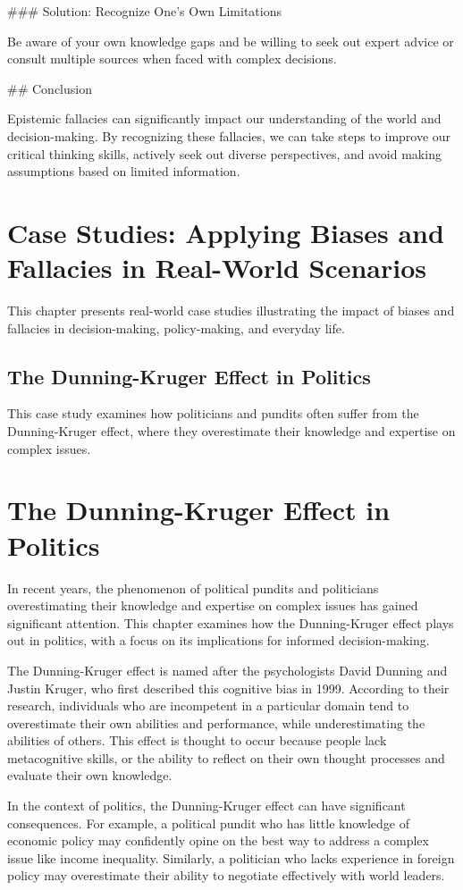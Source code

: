 \documentclass{report}%
\begin{document}
{{{{{{{{{{{{{{### Solution: Recognize One's Own Limitations

Be aware of your own knowledge gaps and be willing to seek out expert advice or consult multiple sources when faced with complex decisions.

## Conclusion

Epistemic fallacies can significantly impact our understanding of the world and decision-making. By recognizing these fallacies, we can take steps to improve our critical thinking skills, actively seek out diverse perspectives, and avoid making assumptions based on limited information.%
\chapter{Case Studies: Applying Biases and Fallacies in Real{-}World Scenarios}%
This chapter presents real-world case studies illustrating the impact of biases and fallacies in decision-making, policy-making, and everyday life.

%
\section{The Dunning{-}Kruger Effect in Politics}%
This case study examines how politicians and pundits often suffer from the Dunning-Kruger effect, where they overestimate their knowledge and expertise on complex issues.

%
\chapter{The Dunning-Kruger Effect in Politics}

In recent years, the phenomenon of political pundits and politicians overestimating their knowledge and expertise on complex issues has gained significant attention. This chapter examines how the Dunning-Kruger effect plays out in politics, with a focus on its implications for informed decision-making.

The Dunning-Kruger effect is named after the psychologists David Dunning and Justin Kruger, who first described this cognitive bias in 1999. According to their research, individuals who are incompetent in a particular domain tend to overestimate their own abilities and performance, while underestimating the abilities of others. This effect is thought to occur because people lack metacognitive skills, or the ability to reflect on their own thought processes and evaluate their own knowledge.

In the context of politics, the Dunning-Kruger effect can have significant consequences. For example, a political pundit who has little knowledge of economic policy may confidently opine on the best way to address a complex issue like income inequality. Similarly, a politician who lacks experience in foreign policy may overestimate their ability to negotiate effectively with world leaders.

}}}}}}}}}}}}}}
\end{document}
